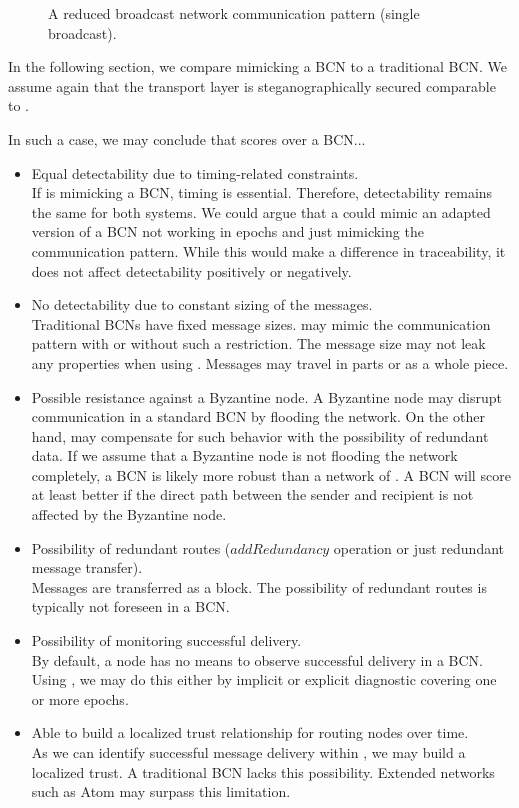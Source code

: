 \begin{figure}[ht]\centering
	
	\caption{A reduced broadcast network communication pattern (single broadcast).}
	\label{fig:bcRedCommPattern}
\end{figure}

In the following section, we compare \MessageVortex{} mimicking a BCN to a traditional BCN. We assume again that the transport layer is steganographically secured comparable to \MessageVortex.

In such a case, we may conclude that \MessageVortex{} scores over a BCN...
\begin{itemize}
	\item Equal detectability due to timing-related constraints.\\
	If \MessageVortex{} is mimicking a BCN, timing is essential. Therefore, detectability remains the same for both systems. We could argue that a \MessageVortex{} could mimic an adapted version of a BCN not working in epochs and just mimicking the communication pattern. While this would make a difference in traceability, it does not affect detectability positively or negatively.
	\item No detectability due to constant sizing of the messages.\\
	Traditional BCNs have fixed message sizes. \MessageVortex{} may mimic the communication pattern with or without such a restriction. The message size may not leak any properties when using \MessageVortex{}. Messages may travel in parts or as a whole piece.
	\item Possible resistance against a Byzantine node.
	A Byzantine node may disrupt communication in a standard BCN by flooding the network. On the other hand, \MessageVortex{} may compensate for such behavior with the possibility of redundant data. If we assume that a Byzantine node is not flooding the network completely, a BCN is likely more robust than a network of \VortexNodes{}. A BCN will score at least better if the direct path between the sender and recipient is not affected by the Byzantine node. 
	\item Possibility of redundant routes ($addRedundancy$ operation or just redundant message transfer).\\
	Messages are transferred as a block. The possibility of redundant routes is typically not foreseen in a BCN.
	\item Possibility of monitoring successful delivery.\\
	By default, a node has no means to observe successful delivery in a BCN. Using \MessageVortex{}, we may do this either by implicit or explicit diagnostic covering one or more epochs.
	\item Able to build a localized trust relationship for routing nodes over time.\\
	As we can identify successful message delivery within \MessageVortex{}, we may build a localized trust. A traditional BCN lacks this possibility. Extended networks such as Atom may surpass this limitation.
\end{itemize}

